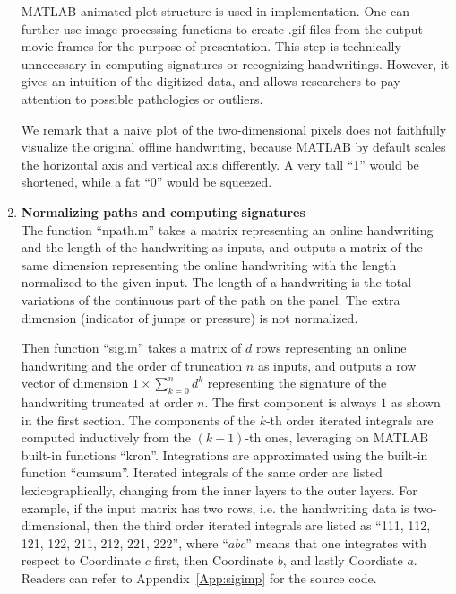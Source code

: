 \documentclass[fleqn]{article}
\theoremstyle{definition}
\theoremstyle{remark}
\begin{document}
\begin{enumerate}
\par
MATLAB animated plot structure is used in implementation. One can further use image processing functions to create .gif files from the output movie frames for the purpose of presentation. This step is technically unnecessary in computing signatures or recognizing handwritings. However, it gives an intuition of the digitized data, and allows researchers to pay attention to possible pathologies or outliers.

\par
We remark that a naive plot of the two-dimensional pixels does not faithfully visualize the original offline handwriting, because MATLAB by default scales the horizontal axis and vertical axis differently. A very tall ``1'' would be shortened, while a fat ``0'' would be squeezed. 

\item \textbf{Normalizing paths and computing signatures} \\
The function ``npath.m'' takes a matrix representing an online handwriting and the length of the handwriting as inputs, and outputs a matrix of the same dimension representing the online handwriting with the length normalized to the given input. The length of a handwriting is the total variations of the continuous part of the path on the panel. The extra dimension (indicator of jumps or pressure) is not normalized.

\par
Then function ``sig.m'' takes a matrix of $d$ rows representing an online handwriting and the order of truncation $n$ as inputs, and outputs a row vector of dimension $1\times \sum_{k=0}^n d^k$ representing the signature of the handwriting truncated at order $n$. The first component is always $1$ as shown in the first section. The components of the $k$-th order iterated integrals are computed inductively from the $(k-1)$-th ones, leveraging on MATLAB built-in functions ``kron''. Integrations are approximated using the built-in function ``cumsum''. Iterated integrals of the same order are listed lexicographically, changing from the inner layers to the outer layers. For example, if the input matrix has two rows, i.e. the handwriting data is two-dimensional, then the third order iterated integrals are listed as ``111, 112, 121, 122, 211, 212, 221, 222'', where ``$abc$'' means that one integrates with respect to Coordinate $c$ first, then Coordinate $b$, and lastly Coordiate $a$. Readers can refer to Appendix~\ref{App:sigimp} for the source code.


\end{enumerate}
\end{document}
